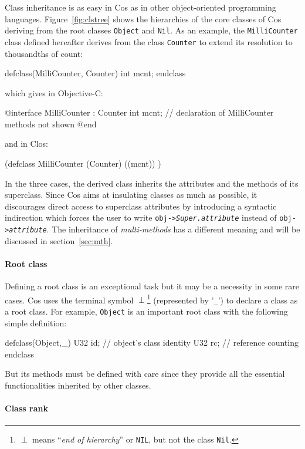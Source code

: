 \documentclass[preprint,10pt]{sigplanconf}
\newcommand{\ProgLang}[1]{{\sc #1}\xspace}
\newcommand{\Clos}      {\ProgLang{Clos}}
\newcommand{\Cos}       {\ProgLang{Cos}}
\newcommand{\Objc}      {\ProgLang{Objective-C}}
\newcommand{\code}[1]{\lstinline[language=COS,style=samplecode]|#1|}
\begin{document}
Class inheritance is as easy in \Cos as in other object-oriented programming languages. Figure~\ref{fig:clstree} shows the hierarchies of the core classes of \Cos deriving from the root classes \code{Object} and \code{Nil}. As an example, the \code{MilliCounter} class defined hereafter derives from the class \code{Counter} to extend its resolution to thousandths of count:
\begin{COS}
defclass(MilliCounter, Counter)
  int mcnt;
endclass
\end{COS}
which gives in \Objc:
\begin{OBJC}
@interface MilliCounter : Counter {
  int mcnt;
}
// declaration of MilliCounter methods not shown
@end
\end{OBJC}
and in \Clos:
\begin{CLOS}
(defclass MilliCounter (Counter) ((mcnt)) )
\end{CLOS}
In the three cases, the derived class inherits the attributes and the methods of its superclass.
Since \Cos aims at insulating classes as much as possible, it discourages direct access to superclass attributes by introducing a syntactic indirection which forces the user to write \code{obj->}{\tt\em Super.attribute} instead of \code{obj->}{\tt\em attribute}. The inheritance of {\em multi-methods} has a different meaning and will be discussed in section~\ref{sec:mth}.

\paragraph{Root class}

Defining a root class is an exceptional task but it may be a necessity in some rare cases. \Cos uses the terminal symbol $\perp$\footnote{$\perp$ means ``{\em end of hierarchy}'' or \code{NIL}, but not the class \code{Nil}.} (represented by '\code{_}') to declare a class as a root class. For example, \code{Object} is an important root class with the following simple definition:
\begin{COS}
defclass(Object,_)
  U32 id;		// object's class identity
  U32 rc;		// reference counting
endclass
\end{COS}
But its methods must be defined with care since they provide all the essential functionalities inherited by other classes.

\paragraph{Class rank}
\end{document}
